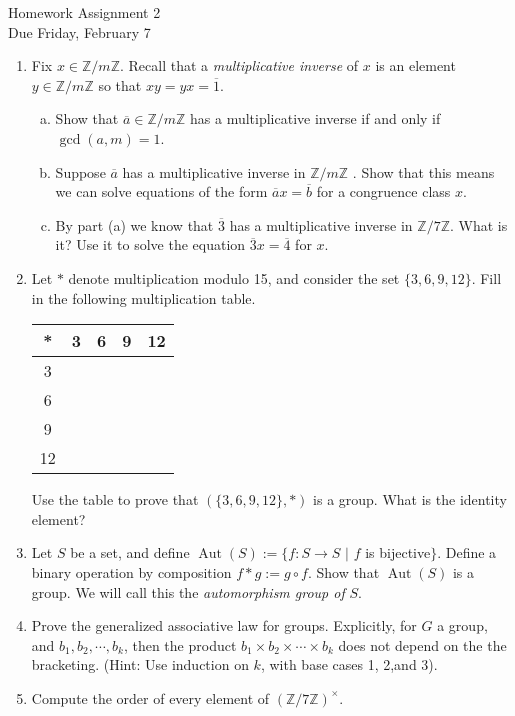 \documentclass[11pt]{article}
\begin{document}
\begin{center}
\Large {Homework Assignment 2}\\
\small {Due Friday, February 7}
\end{center}
\begin{enumerate}
\item Fix $x\in\mathbb{Z}/m\mathbb{Z}$.  Recall that a \textit{multiplicative inverse} of $x$ is an element $y\in\mathbb{Z}/m\mathbb{Z}$ so that $xy=yx=\overline 1$.
\begin{enumerate}[(a)]
\item Show that $\overline a\in\mathbb{Z}/m\mathbb{Z}$ has a multiplicative inverse if and only if $\operatorname{gcd}(a,m)=1$.
\item Suppose $\overline a$ has a multiplicative inverse in $\mathbb{Z}/m\mathbb{Z}$  .  Show that this means we can solve equations of the form $\overline a x = \overline b$ for a congruence class $x$.
\item By part (a) we know that $\overline 3$ has a multiplicative inverse in $\mathbb{Z}/7\mathbb{Z}$.  What is it?  Use it to solve the equation $\overline 3x = \overline 4$ for $x$.
\end{enumerate}
\item Let $*$ denote multiplication modulo 15, and consider the set $\{3,6,9,12\}$.  Fill in the following multiplication table.
\begin{center}
\begin{tabular}{c|c|c|c|c}
* & 3 & 6 & 9 & 12\\
\hline
3 &&&&\\
\hline
6 &&&&\\
\hline
9 &&&&\\
\hline
12&&&&
\end{tabular}
\end{center}
Use the table to prove that $\left(\{3,6,9,12\},*\right)$ is a group.  What is the identity element?
\item Let $S$ be a set, and define $\operatorname{Aut}(S):=\{f:S\to S$ $|$ $f$ is bijective$\}$.  Define a binary operation by composition $f*g := g\circ f$.  Show that $\operatorname{Aut}(S)$ is a group.  We will call this the \textit{automorphism group of }$S$.
\item Prove the generalized associative law for groups.  Explicitly, for $G$ a group, and $b_1,b_2,\cdots,b_k$, then the product $b_1\times b_2\times\cdots\times b_k$ does not depend on the the bracketing.  (Hint: Use induction on $k$, with base cases 1, 2,and 3).
\item Compute the order of every element of $(\mathbb{Z}/7\mathbb{Z})^\times$.

\end{enumerate}
\end{document}
